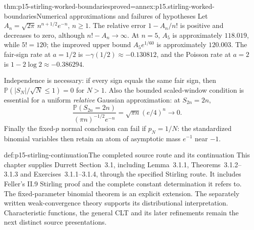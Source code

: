 \begin{hbtheorem}{thm:p15-stirling-worked-boundaries}{proved=annex:p15.stirling-worked-boundaries}{Numerical approximations and failures of hypotheses}
Let \(A_n=\sqrt{2\pi}\,n^{n+1/2}e^{-n}\), \(n\geq1\).
The relative error \(1-A_n/n!\) is positive and decreases to
zero, although \(n!-A_n\to\infty\).
At \(n=5\), \(A_5\) is approximately \(118.019\), while
\(5!=120\); the improved upper bound \(A_5e^{1/60}\)
is approximately \(120.003\).
The fair-sign rate at \(a=1/2\) is
\(-\gamma(1/2)\approx-0.130812\), and the Poisson rate at
\(a=2\) is \(1-2\log2\approx-0.386294\).

Independence is necessary: if every sign equals the same fair
sign, then \(\mathbb P(|S_N|/\sqrt N\leq1)=0\) for \(N>1\).
Also the bounded scaled-window condition is essential for a
uniform \emph{relative} Gaussian approximation: at \(S_{2n}=2n\),
\[
 \frac{\mathbb P(S_{2n}=2n)}
              {(\pi n)^{-1/2}e^{-n}}
       =\sqrt{\pi n}(e/4)^n\longrightarrow0.
\]
Finally the fixed-\(p\) normal conclusion can fail if \(p_N=1/N\):
the standardized binomial variables then retain an atom of
asymptotic mass \(e^{-1}\) near \(-1\).
\end{hbtheorem}

\begin{proofboundary}{def:p15-stirling-continuation}{The completed source route and its continuation}
This chapter supplies Durrett Section~3.1, including Lemma~3.1.1,
Theorems~3.1.2--3.1.3 and Exercises~3.1.1--3.1.4, through
the specified Stirling route. It includes Feller's II.9
Stirling proof and the complete constant determination it
refers to. The fixed-parameter binomial theorem is an explicit
extension. The separately written weak-convergence theory
supports its distributional interpretation.
Characteristic functions, the general CLT and its later refinements
remain the next distinct source presentations.
\end{proofboundary}
